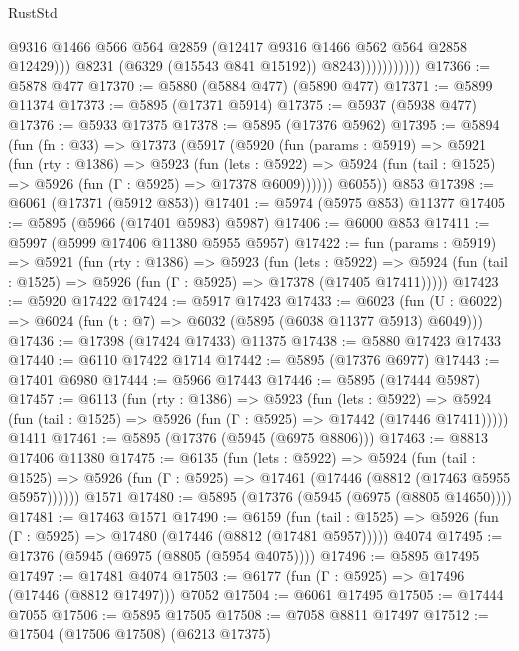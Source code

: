\begin{lexlean}{RustStd}
\begin{coremodule}
{{                              @9316
                              @1466
                              @566
                              @564
                              @2859
                              (@12417 @9316 @1466 @562 @564 @2858 @12429)))
                          @8231
                          (@6329 (@15543 @841 @15192))
                          @8243)))))))))))
@17366 := @5878 @477
@17370 := @5880 (@5884 @477) (@5890 @477)
@17371 := @5899 @11374
@17373 := @5895 (@17371 @5914)
@17375 := @5937 (@5938 @477)
@17376 := @5933 @17375
@17378 := @5895 (@17376 @5962)
@17395 := @5894
    (fun (fn : @33) =>
    @17373
      (@5917
        (@5920
          (fun (params : @5919) =>
          @5921
            (fun (rty : @1386) =>
            @5923
              (fun (lets : @5922) =>
              @5924 (fun (tail : @1525) => @5926 (fun (Γ : @5925) => @17378 @6009))))))
        @6055))
    @853
@17398 := @6061 (@17371 (@5912 @853))
@17401 := @5974 (@5975 @853) @11377
@17405 := @5895 (@5966 (@17401 @5983) @5987)
@17406 := @6000 @853
@17411 := @5997 (@5999 @17406 @11380 @5955 @5957)
@17422 := fun (params : @5919) =>
  @5921
    (fun (rty : @1386) =>
    @5923
      (fun (lets : @5922) =>
      @5924 (fun (tail : @1525) => @5926 (fun (Γ : @5925) => @17378 (@17405 @17411)))))
@17423 := @5920 @17422
@17424 := @5917 @17423
@17433 := @6023
    (fun (U : @6022) => @6024 (fun (t : @7) => @6032 (@5895 (@6038 @11377 @5913) @6049)))
@17436 := @17398 (@17424 @17433) @11375
@17438 := @5880 @17423 @17433
@17440 := @6110 @17422 @1714
@17442 := @5895 (@17376 @6977)
@17443 := @17401 @6980
@17444 := @5966 @17443
@17446 := @5895 (@17444 @5987)
@17457 := @6113
    (fun (rty : @1386) =>
    @5923
      (fun (lets : @5922) =>
      @5924 (fun (tail : @1525) => @5926 (fun (Γ : @5925) => @17442 (@17446 @17411)))))
    @1411
@17461 := @5895 (@17376 (@5945 (@6975 @8806)))
@17463 := @8813 @17406 @11380
@17475 := @6135
    (fun (lets : @5922) =>
    @5924
      (fun (tail : @1525) =>
      @5926 (fun (Γ : @5925) => @17461 (@17446 (@8812 (@17463 @5955 @5957))))))
    @1571
@17480 := @5895 (@17376 (@5945 (@6975 (@8805 @14650))))
@17481 := @17463 @1571
@17490 := @6159
    (fun (tail : @1525) => @5926 (fun (Γ : @5925) => @17480 (@17446 (@8812 (@17481 @5957)))))
    @4074
@17495 := @17376 (@5945 (@6975 (@8805 (@5954 @4075))))
@17496 := @5895 @17495
@17497 := @17481 @4074
@17503 := @6177 (fun (Γ : @5925) => @17496 (@17446 (@8812 @17497))) @7052
@17504 := @6061 @17495
@17505 := @17444 @7055
@17506 := @5895 @17505
@17508 := @7058 @8811 @17497
@17512 := @17504 (@17506 @17508) (@6213 @17375)
}}
\end{coremodule}
\end{lexlean}
